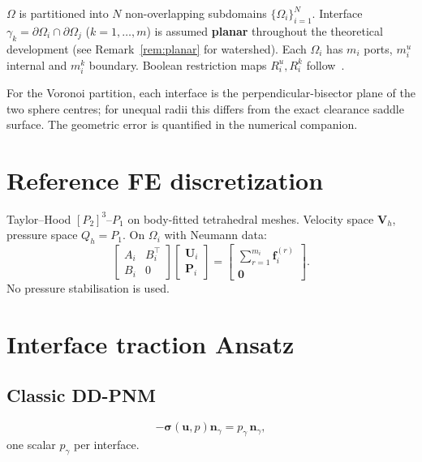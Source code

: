 \documentclass[11pt,a4paper]{article}
\newcommand{\dom}{\Omega}
\newcommand{\pore}[1]{\Omega_{#1}}
\newcommand{\iface}{\gamma}
\newcommand{\vel}{\bm{u}}
\newcommand{\pres}{p}
\newcommand{\stress}{\bm{\sigma}}
\newcommand{\normal}{\bm{n}}
\begin{document}
$\dom$ is partitioned into $N$ non-overlapping subdomains
$\{\pore{i}\}_{i=1}^N$.
Interface $\iface_k = \partial\pore{i} \cap \partial\pore{j}$
($k=1,\dots,m$) is assumed \textbf{planar} throughout the theoretical
development (see Remark~\ref{rem:planar} for watershed).
Each $\pore{i}$ has $m_i$ ports, $m_i^u$ internal and $m_i^k$ boundary.
Boolean restriction maps $R_i^u,R_i^k$ follow~\cite{sun2025ddpnm}.

For the Voronoi partition, each interface is the perpendicular-bisector
plane of the two sphere centres; for unequal radii this differs from the
exact clearance saddle surface.  The geometric error is quantified in the
numerical companion.

\section{Reference FE discretization}
\label{sec:fe}

Taylor--Hood $[P_2]^3$--$P_1$ on body-fitted tetrahedral meshes.
Velocity space $\mathbf{V}_h$, pressure space $Q_h = P_1$.
On $\pore{i}$ with Neumann data:
\begin{equation}\label{eq:local-fe}
  \begin{bmatrix} A_i & B_i^\top \\ B_i & 0 \end{bmatrix}
  \begin{bmatrix} \mathbf{U}_i \\ \mathbf{P}_i \end{bmatrix}
  = \begin{bmatrix} \sum_{r=1}^{m_i} \bm{f}_i^{(r)} \\ \bm{0} \end{bmatrix}.
\end{equation}
No pressure stabilisation is used.

\section{Interface traction Ansatz}
\label{sec:affine-ansatz}

\subsection{Classic DD-PNM}
\begin{equation}\label{eq:classic}
  -\stress(\vel,\pres)\normal_\gamma = p_\gamma\,\normal_\gamma,
\end{equation}
one scalar $p_\gamma$ per interface.
\end{document}

